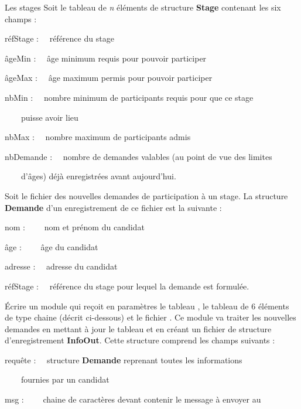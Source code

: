 \begin{Exercice}{Les stages}
	Soit le tableau  de \textit{n} éléments de
	structure \textbf{Stage} contenant les six champs : \ \ 

	{	réfStage  : \ \ référence du stage}

	{	âgeMin : \ \ âge minimum requis pour pouvoir participer}

	{	âgeMax : \ \ âge maximum permis pour pouvoir participer}

	{	nbMin : \ \ nombre minimum de participants requis pour que ce stage }

	{	\ \ \ \ puisse avoir lieu}

	{	nbMax : \ \ nombre maximum de participants admis}

	{	nbDemande : \ \ nombre de demandes valables (au point de vue des limites}

	{	\ \ \ \ d’âges) déjà enregistrées avant aujourd’hui.}

	\bigskip

	Soit le fichier  des nouvelles demandes de
	participation à un stage. La structure \textbf{Demande} d’un
	enregistrement de ce fichier est la suivante :

	\bigskip

	\bigskip

	{	nom : \ \ \ \ nom et prénom du candidat}

	{	âge : \ \ \ \ âge du candidat}

	{	adresse : \ \ adresse du candidat}

	{	réfStage : \ \ référence du stage pour lequel la demande est formulée.}


	\bigskip

	Écrire un module qui reçoit en paramètres le tableau
	, le tableau  de
	6 éléments de type chaine (décrit ci-dessous) et le fichier
	. Ce module va traiter les nouvelles
	demandes en mettant à jour le tableau  et en
	créant un fichier  de structure
	d’enregistrement \textbf{InfoOut}. Cette structure comprend les champs
	suivants :

	\bigskip

	requête : \ \ structure \textbf{Demande}\textbf{\textit{ }}reprenant
	toutes les informations 

	{	\ \ \ \ fournies par un candidat}

	{	msg : \ \ \ \ chaine de caractères devant contenir le message à envoyer
	au}


\end{Exercice}
